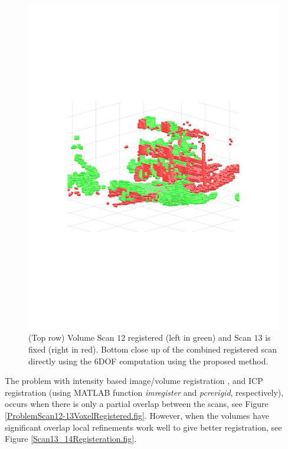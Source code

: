 \documentclass{UCF_ETD}
\begin{document}
\begin{figure}[H]
\begin{center}
\includegraphics[scale=0.54]{RobustRegistration/Scan12_13CloseUpRegistered}
\caption{(Top row) Volume Scan $12$ registered (left in green) and Scan $13$ is fixed (right in red). Bottom close up of the combined registered scan directly using the $6$DOF computation using the proposed method.}
\label{Scan12-13VoxelRegistered.fig}
\end{center}
\end{figure}

The problem with intensity based image/volume registration \cite{Pluim2003},\cite{KimJeff2004} and ICP registration \cite{McKay1992} (using MATLAB function \emph{imregister} and \emph{pcrerigid}, respectively), occurs when there is only a partial overlap between the scans, see Figure \ref{ProblemScan12-13VoxelRegistered.fig}. However, when the volumes have significant overlap local refinements work well to give better registration, see Figure \ref{Scan13_14Registeration.fig}. 
\end{document}
